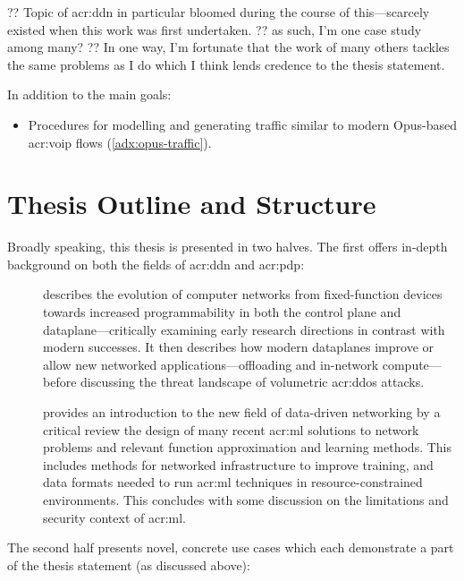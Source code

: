 ?? Topic of \gls{acr:ddn} in particular bloomed during the course of this---scarcely existed when this work was first undertaken.
?? as such, I'm one case study among many?
?? In one way, I'm fortunate that the work of many others tackles the same problems as I do which I think lends credence to the thesis statement.

In addition to the main goals:
\begin{itemize}
	\item Procedures for modelling and generating traffic similar to modern Opus-based \gls{acr:voip} flows (\cref{adx:opus-traffic}).
\end{itemize}

\section{Thesis Outline and Structure}
Broadly speaking, this thesis is presented in two halves.
The first offers in-depth background on both the fields of \gls{acr:ddn} and \gls{acr:pdp}:
\begin{description}
	\item[] describes the evolution of computer networks from fixed-function devices towards increased programmability in both the control plane and dataplane---critically examining early research directions in contrast with modern successes. It then describes how modern dataplanes improve or allow new networked applications---offloading and in-network compute---before discussing the threat landscape of volumetric \gls{acr:ddos} attacks.
	\item[] provides an introduction to the new field of data-driven networking by a critical review the design of many recent \gls{acr:ml} solutions to network problems and relevant function approximation and learning methods. This includes methods for networked infrastructure to improve training, and data formats needed to run \gls{acr:ml} techniques in resource-constrained environments. This concludes with some discussion on the limitations and security context of \gls{acr:ml}.
\end{description}
The second half presents novel, concrete use cases which each demonstrate a part of the thesis statement (as discussed above):
